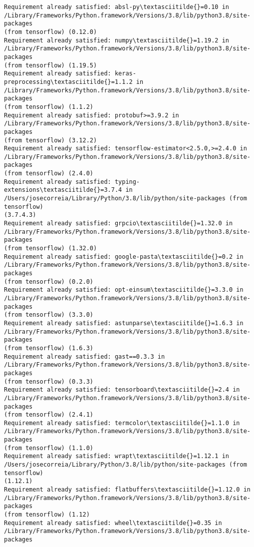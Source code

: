 \documentclass[11pt]{article}
\begin{document}
\begin{Verbatim}[commandchars=\\\{\}]
Requirement already satisfied: absl-py\textasciitilde{}=0.10 in
/Library/Frameworks/Python.framework/Versions/3.8/lib/python3.8/site-packages
(from tensorflow) (0.12.0)
Requirement already satisfied: numpy\textasciitilde{}=1.19.2 in
/Library/Frameworks/Python.framework/Versions/3.8/lib/python3.8/site-packages
(from tensorflow) (1.19.5)
Requirement already satisfied: keras-preprocessing\textasciitilde{}=1.1.2 in
/Library/Frameworks/Python.framework/Versions/3.8/lib/python3.8/site-packages
(from tensorflow) (1.1.2)
Requirement already satisfied: protobuf>=3.9.2 in
/Library/Frameworks/Python.framework/Versions/3.8/lib/python3.8/site-packages
(from tensorflow) (3.12.2)
Requirement already satisfied: tensorflow-estimator<2.5.0,>=2.4.0 in
/Library/Frameworks/Python.framework/Versions/3.8/lib/python3.8/site-packages
(from tensorflow) (2.4.0)
Requirement already satisfied: typing-extensions\textasciitilde{}=3.7.4 in
/Users/josecorreia/Library/Python/3.8/lib/python/site-packages (from tensorflow)
(3.7.4.3)
Requirement already satisfied: grpcio\textasciitilde{}=1.32.0 in
/Library/Frameworks/Python.framework/Versions/3.8/lib/python3.8/site-packages
(from tensorflow) (1.32.0)
Requirement already satisfied: google-pasta\textasciitilde{}=0.2 in
/Library/Frameworks/Python.framework/Versions/3.8/lib/python3.8/site-packages
(from tensorflow) (0.2.0)
Requirement already satisfied: opt-einsum\textasciitilde{}=3.3.0 in
/Library/Frameworks/Python.framework/Versions/3.8/lib/python3.8/site-packages
(from tensorflow) (3.3.0)
Requirement already satisfied: astunparse\textasciitilde{}=1.6.3 in
/Library/Frameworks/Python.framework/Versions/3.8/lib/python3.8/site-packages
(from tensorflow) (1.6.3)
Requirement already satisfied: gast==0.3.3 in
/Library/Frameworks/Python.framework/Versions/3.8/lib/python3.8/site-packages
(from tensorflow) (0.3.3)
Requirement already satisfied: tensorboard\textasciitilde{}=2.4 in
/Library/Frameworks/Python.framework/Versions/3.8/lib/python3.8/site-packages
(from tensorflow) (2.4.1)
Requirement already satisfied: termcolor\textasciitilde{}=1.1.0 in
/Library/Frameworks/Python.framework/Versions/3.8/lib/python3.8/site-packages
(from tensorflow) (1.1.0)
Requirement already satisfied: wrapt\textasciitilde{}=1.12.1 in
/Users/josecorreia/Library/Python/3.8/lib/python/site-packages (from tensorflow)
(1.12.1)
Requirement already satisfied: flatbuffers\textasciitilde{}=1.12.0 in
/Library/Frameworks/Python.framework/Versions/3.8/lib/python3.8/site-packages
(from tensorflow) (1.12)
Requirement already satisfied: wheel\textasciitilde{}=0.35 in
/Library/Frameworks/Python.framework/Versions/3.8/lib/python3.8/site-packages

\end{Verbatim}
\end{document}
